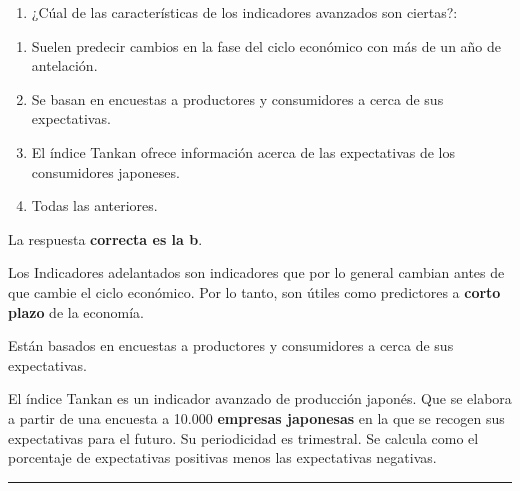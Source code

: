 \documentclass[
  letterpaper,
  DIV=11,
  numbers=noendperiod]{scrreprt}
\providecommand{\tightlist}{%
  \setlength{\itemsep}{0pt}\setlength{\parskip}{0pt}}\usepackage{longtable,booktabs,array}
\begin{document}
\begin{enumerate}
\def\labelenumi{\arabic{enumi}.}
\setcounter{enumi}{49}
\tightlist
\item
  ¿Cúal de las características de los indicadores avanzados son
  ciertas?:
\end{enumerate}

\begin{enumerate}
\def\labelenumi{\alph{enumi})}
\item
  Suelen predecir cambios en la fase del ciclo económico con más de un
  año de antelación.
\item
  Se basan en encuestas a productores y consumidores a cerca de sus
  expectativas.
\item
  El índice Tankan ofrece información acerca de las expectativas de los
  consumidores japoneses.
\item
  Todas las anteriores.
\end{enumerate}

\begin{tcolorbox}[enhanced jigsaw, left=2mm, opacityback=0, colback=white, breakable, arc=.35mm, bottomrule=.15mm, rightrule=.15mm, toprule=.15mm, leftrule=.75mm, colframe=quarto-callout-tip-color-frame]
\begin{minipage}[t]{5.5mm}
\textcolor{quarto-callout-tip-color}{\faLightbulb}
\end{minipage}%
\begin{minipage}[t]{\textwidth - 5.5mm}

La respuesta \textbf{correcta es la b}.

Los Indicadores adelantados son indicadores que por lo general cambian
antes de que cambie el ciclo económico. Por lo tanto, son útiles como
predictores a \textbf{corto plazo} de la economía.

Están basados en encuestas a productores y consumidores a cerca de sus
expectativas.

El índice Tankan es un indicador avanzado de producción japonés. Que se
elabora a partir de una encuesta a 10.000 \textbf{empresas japonesas} en
la que se recogen sus expectativas para el futuro. Su periodicidad es
trimestral. Se calcula como el porcentaje de expectativas positivas
menos las expectativas negativas.

\end{minipage}%
\end{tcolorbox}

\begin{center}\rule{0.5\linewidth}{0.5pt}\end{center}
\end{document}
